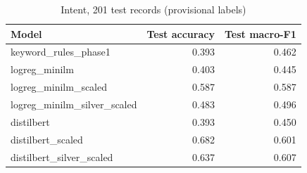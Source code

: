 \begin{table}[t]
\centering
\caption{Intent, 201 test records (provisional labels)}
\label{tab:intent}
\begin{tabular}{lrr}
\toprule
Model & Test accuracy & Test macro-F1 \\
\midrule
keyword\_rules\_phase1 & 0.393 & 0.462 \\
logreg\_minilm & 0.403 & 0.445 \\
logreg\_minilm\_scaled & 0.587 & 0.587 \\
logreg\_minilm\_silver\_scaled & 0.483 & 0.496 \\
distilbert & 0.393 & 0.450 \\
distilbert\_scaled & 0.682 & 0.601 \\
distilbert\_silver\_scaled & 0.637 & 0.607 \\
\bottomrule
\end{tabular}
\end{table}
